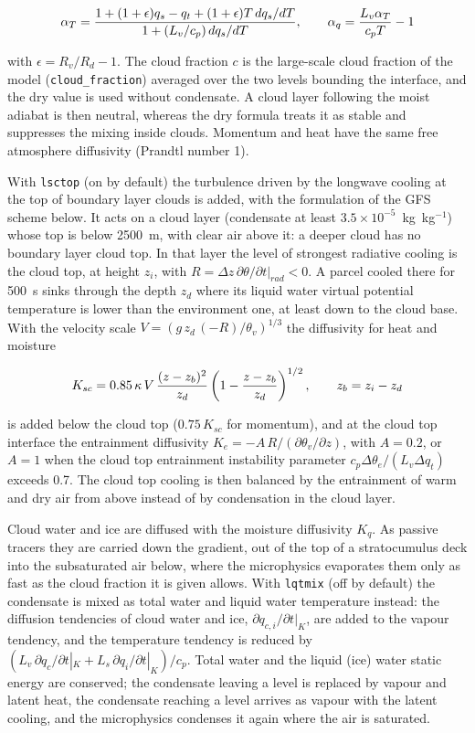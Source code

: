 \begin{eqnarray}
\alpha_T = { 1 + (1+\epsilon) q_s - q_t + (1+\epsilon) T\,dq_s/dT
            \over 1 + (L_v/c_p)\,dq_s/dT }, \qquad
\alpha_q = { L_v \alpha_T \over c_p T } - 1
\end{eqnarray}

with $\epsilon = R_v/R_d - 1$.  The cloud fraction $c$ is the large-scale cloud
fraction of the model (\texttt{cloud\_fraction}) averaged over the two levels bounding
the interface, and the dry value is used without condensate.  A cloud layer following the moist adiabat
is then neutral, whereas the dry formula treats it as stable and suppresses
the mixing inside clouds.  Momentum and heat have the same free atmosphere
diffusivity (Prandtl number 1).

With \verb=lsctop= (on by default) the turbulence driven by the longwave
cooling at the top of boundary layer clouds \citep{Lock_00} is added, with
the formulation of the GFS scheme below.  It acts on a cloud layer (condensate
at least $3.5\times10^{-5}$~kg~kg$^{-1}$) whose top is below 2500~m, with
clear air above it: a deeper cloud has no boundary layer cloud top.  In that
layer the level of strongest radiative cooling is the cloud top, at height
$z_i$, with
$R = \Delta z\,\partial\theta/\partial t|_{rad} < 0$.  A parcel cooled
there for 500~s sinks through the depth $z_d$ where its liquid water virtual
potential temperature is lower than the environment one, at least down to the
cloud base.  With the velocity scale $V = (g\,z_d\,(-R)/\theta_v)^{1/3}$ the
diffusivity for heat and moisture

\begin{eqnarray}
K_{sc} = 0.85\,\kappa\,V\,{(z-z_b)^2 \over z_d}
         \left(1-{z-z_b \over z_d}\right)^{1/2}, \qquad z_b = z_i - z_d
\end{eqnarray}

is added below the cloud top ($0.75\,K_{sc}$ for momentum), and at the cloud
top interface the entrainment diffusivity $K_e = -A\,R/(\partial\theta_v/\partial z)$,
with $A = 0.2$, or $A = 1$ when the cloud top entrainment instability
parameter $c_p\Delta\theta_e/(L_v\Delta q_t)$ exceeds 0.7.  The cloud top
cooling is then balanced by the entrainment of warm and dry air from above
instead of by condensation in the cloud layer.

Cloud water and ice are diffused with the moisture diffusivity $K_q$.  As
passive tracers they are carried down the gradient, out of the top of a
stratocumulus deck into the subsaturated air below, where the microphysics
evaporates them only as fast as the cloud fraction it is given allows.  With
\verb=lqtmix= (off by default) the condensate is mixed as total water and
liquid water temperature instead: the diffusion tendencies of cloud water and
ice, $\partial q_{c,i}/\partial t|_{K}$, are added to the vapour tendency, and
the temperature tendency is reduced by
$(L_v\,\partial q_c/\partial t|_{K} + L_s\,\partial q_i/\partial t|_{K})/c_p$.
Total water and the liquid (ice) water static energy are conserved; the
condensate leaving a level is replaced by vapour and latent heat, the
condensate reaching a level arrives as vapour with the latent cooling, and
the microphysics condenses it again where the air is saturated.

